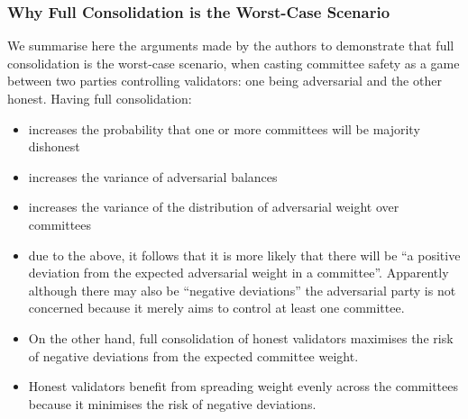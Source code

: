\documentclass[UTF8]{article}
\begin{document}
\subsubsection*{Why Full Consolidation is the Worst-Case Scenario}
We summarise here the arguments made by the authors to demonstrate that full consolidation is the worst-case scenario, when casting committee safety as a game between two parties controlling validators: one being adversarial and the other honest. Having full consolidation:
\begin{itemize}
\item increases the probability that one or more committees will be majority dishonest
\item increases the variance of adversarial balances
\item increases the variance of the distribution of adversarial weight over committees
\item due to the above, it follows that it is more likely that there will be ``a positive deviation from the expected adversarial weight in a committee''. Apparently although there may also be ``negative deviations'' the adversarial party is not concerned because it merely aims to control at least one committee.
\item On the other hand, full consolidation of honest validators maximises the risk of negative deviations from the expected committee weight.
\item Honest validators benefit from spreading weight evenly across the committees because it minimises the risk of negative deviations.
\end{itemize}
\end{document}

